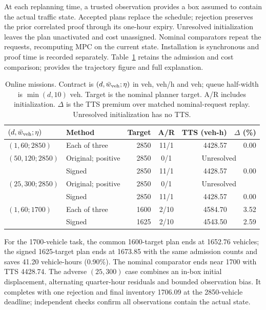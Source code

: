 At each replanning time, a trusted observation provides a box assumed
to contain the actual traffic state. Accepted plans
replace the schedule; rejection preserves the prior correlated proof
through its one-hour expiry. Unresolved initialization leaves the plan
unactivated and cost unassigned. Nominal comparators repeat the requests,
recomputing MPC on the current state. Installation is synchronous and
proof time is recorded separately. Table~\ref{tab:structure-online} retains
the admission and cost comparison; 
provides the trajectory figure and full explanation.

\begin{table}[t]
\centering\small
\caption{Online missions. Contract is $(d,\bar w_{\rm veh};\eta)$ in veh,
veh/h and veh; queue half-width is $\min(d,10)$ veh. Target is the nominal
planner target. A/R includes initialization. $\Delta$ is the TTS premium
over matched nominal-request replay. Unresolved initialization has no TTS.}
\label{tab:structure-online}
\setlength{\tabcolsep}{3pt}
\begin{tabular}{@{}l l r c r r@{}}
\toprule
$(d,\bar w_{\rm veh};\eta)$ & Method & Target & A/R & TTS (veh-h) & $\Delta$ (\%)\\
\midrule
$(1,60;2850)$ & Each of three & 2850 & 11/1 & 4428.57 & 0.00\\
$(50,120;2850)$ & Original; positive & 2850 & 0/1 & \multicolumn{2}{c}{Unresolved}\\
 & Signed & 2850 & 11/1 & 4428.57 & 0.00\\
$(25,300;2850)$ & Original; positive & 2850 & 0/1 & \multicolumn{2}{c}{Unresolved}\\
 & Signed & 2850 & 11/1 & 4428.57 & 0.00\\
$(1,60;1700)$ & Each of three & 1600 & 2/10 & 4584.70 & 3.52\\
 & Signed & 1625 & 2/10 & 4543.50 & 2.59\\
\bottomrule
\end{tabular}
\end{table}

For the 1700-vehicle task, the common 1600-target plan ends at 1652.76
vehicles; the signed 1625-target plan ends at 1673.85 with the same admission
counts and saves 41.20 vehicle-hours (0.90\%). The nominal comparator ends
near 1700 with TTS 4428.74. The adverse $(25,300)$ case combines an in-box
initial displacement, alternating quarter-hour residuals and bounded
observation bias. It completes with one rejection and final inventory
1706.09 at the 2850-vehicle deadline; independent checks confirm all
observations contain the actual state.

